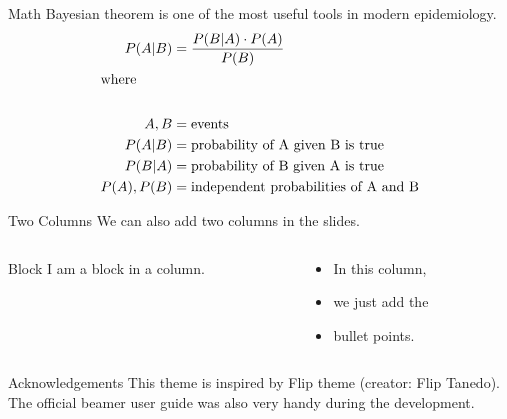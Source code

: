 \documentclass[aspectratio=169]{beamer}
\begin{document}
\begin{frame}[t]{Math}
	Bayesian theorem is one of the most useful tools in modern epidemiology.
	\begin{align*}
		P(A | B) &= \frac{P(B | A)\cdot P(A)}{P(B)} \\
		\intertext{where}\\
		A,B &= \text{events}\\
		P(A | B) &= \text{probability of A given B is true}\\
		P(B | A) &= \text{probability of B given A is true}\\
		P(A),P(B) &= \text{independent probabilities of A and B}
	\end{align*}

\end{frame}

\begin{frame}[t]{Two Columns}
	We can also add two columns in the slides.
	\begin{columns}[t]
		\begin{column}[T]{0.4\textwidth}
			\lipsum[1][1-2]
			\vspace{1em}
			\begin{block}{Block}
				I am a block in a column.
			\end{block}
		\end{column}
		\begin{column}[T]{0.4\textwidth}
			\begin{itemize}
				\item In this column,
				\item we just add the
				\item bullet points.
			\end{itemize}
		\end{column}
	\end{columns}
\end{frame}

\begin{frame}[t]{Acknowledgements}
This theme is inspired by Flip theme (creator: Flip Tanedo). The official beamer user guide was also very handy during the development.
\end{frame}
\end{document}
